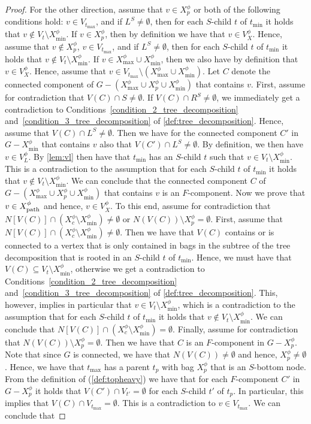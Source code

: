 \documentclass[a4paper,UKenglish,cleveref, autoref, thm-restate, numberwithinsect]{lipics-v2021}
\newcommand{\dpath}{\textup{path}}
\newcommand{\topheavy}{\text{top-heavy}\xspace}
\begin{document}
\begin{proof}
    For the other direction, assume that $v\in X^\phi_p$ or both of the following conditions hold: $v\in V_{t_{\max}}$, and if $L^S\neq\emptyset$, then for each $S$-child $t$ of $t_{\min}$ it holds that $v\notin V_t\setminus X^\phi_{\min}$. If $v\in X^\phi_p$, then by definition we have that $v\in V^\phi_X$. Hence, assume that $v\notin X^\phi_p$, $v\in V_{t_{\max}}$, and if $L^S\neq\emptyset$, then for each $S$-child $t$ of $t_{\min}$ it holds that $v\notin V_t\setminus X^\phi_{\min}$. If $v\in X^\phi_{\max}\cup X^\phi_{\min}$, then we also have by definition that $v\in V^\phi_X$. Hence, assume that $v\in V_{t_{\max}}\setminus (X^\phi_{\max}\cup X^\phi_{\min})$. Let $C$ denote the connected component of $G-(X^\phi_{\max}\cup X^\phi_p\cup X^\phi_{\min})$ that contains $v$. First, assume for contradiction that $V(C)\cap S\neq\emptyset$. If $V(C)\cap R^S\neq\emptyset$, we immediately get a contradiction to Conditions~\ref{condition_2_tree_decomposition} and~\ref{condition_3_tree_decomposition} of \cref{def:tree_decomposition}. Hence, assume that $V(C)\cap L^S\neq\emptyset$. Then we have for the connected component $C'$ in $G-X^\phi_{\min}$ that contains $v$ also that $V(C')\cap L^S\neq\emptyset$. By definition, we then have $v\in V^\phi_L$. By \cref{lem:vl} then have that $t_{\min}$ has an $S$-child $t$ such that $v\in V_t\setminus X^\phi_{\min}$. This is a contradiction to the assumption that for each $S$-child $t$ of $t_{\min}$ it holds that $v\notin V_t\setminus X^\phi_{\min}$. We can conclude that the connected component $C$ of $G-(X^\phi_{\max}\cup X^\phi_p\cup X^\phi_{\min})$ that contains $v$ is an $F$-component. Now we prove that $v\in X^\phi_{\dpath}$ and hence, $v\in V^\phi_X$. To this end, assume for contradiction that $N[V(C)]\cap (X^\phi_c\setminus X^\phi_{\min})\neq\emptyset$ or $N(V(C))\setminus X^\phi_p=\emptyset$. First, assume that $N[V(C)]\cap (X^\phi_c\setminus X^\phi_{\min})\neq\emptyset$. Then we have that $V(C)$ contains or is connected to a vertex that is only contained in bags in the subtree of the tree decomposition that is rooted in an $S$-child $t$ of $t_{\min}$. Hence, we must have that $V(C)\subseteq V_t\setminus X^\phi_{\min}$, otherwise we get a contradiction to Conditions~\ref{condition_2_tree_decomposition} and~\ref{condition_3_tree_decomposition} of \cref{def:tree_decomposition}. This, however, implies in particular that $v\in V_t\setminus X^\phi_{\min}$, which is a contradiction to the assumption that for each $S$-child $t$ of $t_{\min}$ it holds that $v\notin V_t\setminus X^\phi_{\min}$. We can conclude that $N[V(C)]\cap (X^\phi_c\setminus X^\phi_{\min})=\emptyset$. Finally, assume for contradiction that $N(V(C))\setminus X^\phi_p=\emptyset$. Then we have that $C$ is an $F$-component in $G-X^\phi_p$. Note that since $G$ is connected, we have that $N(V(C))\neq\emptyset$ and hence, $X^\phi_p\neq\emptyset$. Hence, we have that $t_{\max}$ has a parent $t_p$ with bag $X^\phi_p$ that is an $S$-bottom node. From the definition of \topheavy{ness} (\cref{def:topheavy}) we have that for each $F$-component $C'$ in $G-X^\phi_p$ it holds that $V(C')\cap V_{t'}=\emptyset$ for each $S$-child $t'$ of $t_p$. In particular, this implies that $V(C)\cap V_{t_{\max}}=\emptyset$. This is a contradiction to $v\in V_{t_{\max}}$. We can conclude that 
\end{proof}
\end{document}
